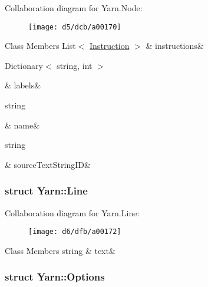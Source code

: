 Collaboration diagram for Yarn.\-Node\-:
\nopagebreak
\begin{figure}[H]
\begin{center}
\leavevmode
\texttt{[image: d5/dcb/a00170]}
\end{center}
\end{figure}
\begin{DoxyFields}{Class Members}
\hypertarget{a00026_a156723a9252b62d288ddf611939ea7c3}{List$<$ \hyperlink{a00044}{Instruction} $>$}\label{a00026_a156723a9252b62d288ddf611939ea7c3}
&
instructions&
\\
\hline

\hypertarget{a00026_a9afa49f4fbc72e806a0210cb4198f12e}{Dictionary$<$ string, int $>$}\label{a00026_a9afa49f4fbc72e806a0210cb4198f12e}
&
labels&
\\
\hline

\hypertarget{a00026_a107b0de3fcfc65e99913edc01b5ce9db}{string}\label{a00026_a107b0de3fcfc65e99913edc01b5ce9db}
&
name&
\\
\hline

\hypertarget{a00026_a09c6af5b50925d0876283b84281b3ed4}{string}\label{a00026_a09c6af5b50925d0876283b84281b3ed4}
&
source\-Text\-String\-I\-D&
\\
\hline

\end{DoxyFields}
\label{d6/d7d/a00161}
\hypertarget{a00026_d6/d7d/a00161}{}
\subsubsection{struct Yarn\-:\-:Line}


Collaboration diagram for Yarn.\-Line\-:
\nopagebreak
\begin{figure}[H]
\begin{center}
\leavevmode
\texttt{[image: d6/dfb/a00172]}
\end{center}
\end{figure}
\begin{DoxyFields}{Class Members}
\hypertarget{a00026_a81d1f04bbb4cf6642d2bd685bda1da20}{string}\label{a00026_a81d1f04bbb4cf6642d2bd685bda1da20}
&
text&
\\
\hline

\end{DoxyFields}
\label{dd/dae/a00163}
\hypertarget{a00026_dd/dae/a00163}{}
\subsubsection{struct Yarn\-:\-:Options}



